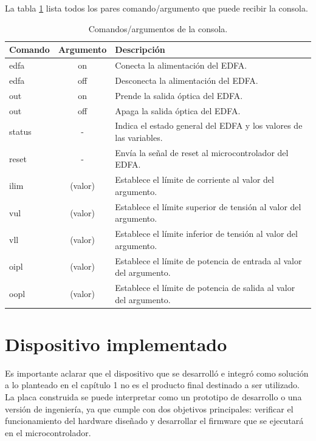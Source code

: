 La tabla \ref{tab:tablacmd} lista todos los pares comando/argumento que puede recibir la consola.

\begin{table}[H]
	\centering
	\caption{Comandos/argumentos de la consola.}
	\begin{tabular}{l c p{8cm}}
		\toprule
		\textbf{Comando} & \textbf{Argumento} & \textbf{Descripción} \\
		\midrule
		edfa	& on & Conecta la alimentación del EDFA.	\\
		edfa	& off & Desconecta la alimentación del EDFA. \\
		out	& on & Prende la salida óptica del EDFA. \\
		out   & off & Apaga la salida óptica del EDFA. \\
		status & - & Indica el estado general del EDFA y los valores de las variables. \\
		reset & - & Envía la señal de reset al microcontrolador del EDFA. \\
		ilim	& (valor) & Establece el límite de corriente al valor del argumento. \\
		vul	& (valor) & Establece el límite superior de tensión al valor del argumento. \\
		vll		& (valor) & Establece el límite inferior de tensión al valor del argumento. \\
		oipl	& (valor) & Establece el límite de potencia de entrada al valor del argumento. \\
		oopl & (valor) & Establece el límite de potencia de salida al valor del argumento. \\
		\bottomrule
		\hline
	\end{tabular}
	\label{tab:tablacmd}
\end{table}

\section{Dispositivo implementado}
\label{sec:dispImp}

Es importante aclarar que el dispositivo que se desarrolló e integró como solución a lo planteado en el capítulo 1 no es el producto final destinado a ser utilizado. La placa construida se puede interpretar como un prototipo de desarrollo o una versión de ingeniería, ya que cumple con dos objetivos principales: verificar el funcionamiento del hardware diseñado y desarrollar el firmware que se ejecutará en el microcontrolador. 

